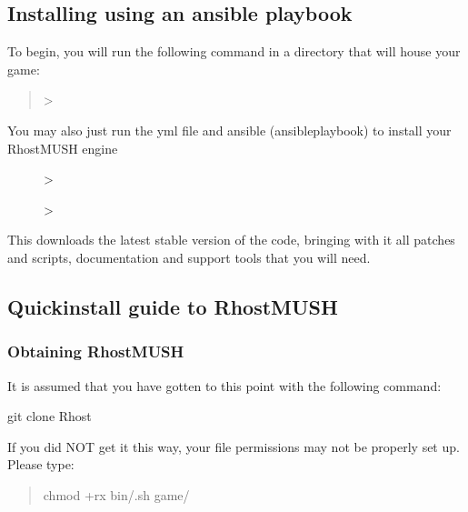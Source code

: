 \documentclass[letterpaper,10pt,english]{sphinxmanual}
\begin{document}
\subsection{Installing using an ansible playbook}
\label{\detokenize{installation:installing-using-an-ansible-playbook}}
\sphinxAtStartPar
To begin, you will run the following command in a directory that will house your game:
\begin{quote}

\sphinxAtStartPar
\textgreater{} 
\end{quote}
\begin{description}
\item[{You may also just run the yml file and ansible (ansible\sphinxhyphen{}playbook) to install your RhostMUSH engine}] \leavevmode
\sphinxAtStartPar
\textgreater{} 

\sphinxAtStartPar
\textgreater{} 

\end{description}

\sphinxAtStartPar
This downloads the latest stable version of the code, bringing with it all patches and scripts, documentation and support tools that you will need.


\subsection{Quickinstall guide to RhostMUSH}
\label{\detokenize{installation:quickinstall-guide-to-rhostmush}}

\subsubsection{Obtaining RhostMUSH}
\label{\detokenize{installation:obtaining-rhostmush}}
\sphinxAtStartPar
It is assumed that you have gotten to this point with the following command:

\sphinxAtStartPar
git clone  Rhost

\sphinxAtStartPar
If you did NOT get it this way, your file permissions may not be properly set
up.  Please type:
\begin{quote}

\sphinxAtStartPar
chmod +rx bin/.sh game/
\end{quote}
\end{document}
